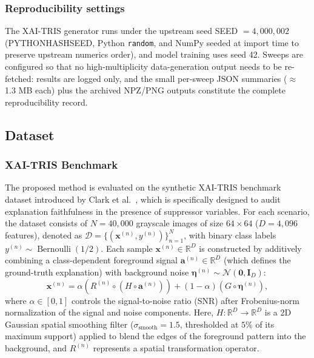 \documentclass[pdflatex,sn-mathphys-num]{sn-jnl}
\theoremstyle{thmstyleone}
\theoremstyle{thmstyletwo}%
\theoremstyle{thmstylethree}%
\begin{document}
\subsubsection{Reproducibility settings}
The XAI-TRIS generator runs under the upstream seed SEED $=4{,}000{,}002$ (PYTHONHASHSEED, Python \texttt{random}, and NumPy seeded at import time to preserve upstream numerics order), and model training uses seed 42. Sweeps are configured so that no high-multiplicity data-generation output needs to be re-fetched: results are logged only, and the small per-sweep JSON summaries ($\approx$ 1.3 MB each) plus the archived NPZ/PNG outputs constitute the complete reproducibility record.

\subsection{Dataset}\label{sec:dataset}
\subsubsection{XAI-TRIS Benchmark}
The proposed method is evaluated on the synthetic XAI-TRIS benchmark dataset introduced by Clark et al.~\cite{clark2024}, which is specifically designed to audit explanation faithfulness in the presence of suppressor variables. For each scenario, the dataset consists of $N = 40{,}000$ grayscale images of size $64 \times 64$ ($D = 4{,}096$ features), denoted as $\mathcal{D} = \{(\mathbf{x}^{(n)}, y^{(n)})\}_{n=1}^N$, with binary class labels $y^{(n)} \sim \operatorname{Bernoulli}(1/2)$. Each sample $\mathbf{x}^{(n)} \in \mathbb{R}^D$ is constructed by additively combining a class-dependent foreground signal $\mathbf{a}^{(n)} \in \mathbb{R}^D$ (which defines the ground-truth explanation) with background noise $\boldsymbol{\eta}^{(n)} \sim \mathcal{N}(\mathbf{0}, \mathbf{I}_D)$:
\begin{equation}
    \mathbf{x}^{(n)} = \alpha \left( R^{(n)} \circ (H \circ \mathbf{a}^{(n)}) \right) + (1 - \alpha)(G \circ \boldsymbol{\eta}^{(n)}),
\end{equation}
where $\alpha \in [0, 1]$ controls the signal-to-noise ratio (SNR) after Frobenius-norm normalization of the signal and noise components. Here, $H: \mathbb{R}^D \to \mathbb{R}^D$ is a 2D Gaussian spatial smoothing filter ($\sigma_{\text{smooth}} = 1.5$, thresholded at $5\%$ of its maximum support) applied to blend the edges of the foreground pattern into the background, and $R^{(n)}$ represents a spatial transformation operator.
\end{document}

